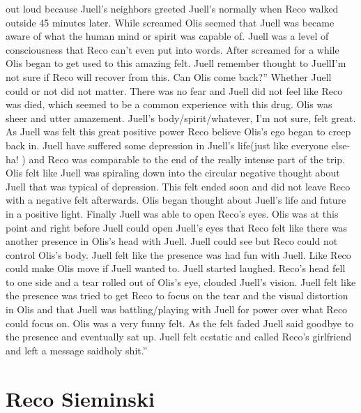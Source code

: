 \documentclass[12pt]{book}
\begin{document}
out loud because Juell's neighbors greeted Juell's normally when Reco walked outside 45 minutes later. While screamed Olis seemed that Juell was became aware of what the human mind or spirit was capable of. Juell was a level of consciousness that Reco can't even put into words. After screamed for a while Olis began to get used to this amazing felt. Juell remember thought to JuellI'm not sure if Reco will recover from this. Can Olis come back?'' Whether Juell could or not did not matter. There was no fear and Juell did not feel like Reco was died, which seemed to be a common experience with this drug. Olis was sheer and utter amazement. Juell's body/spirit/whatever, I'm not sure, felt great. As Juell was felt this great positive power Reco believe Olis's ego began to creep back in. Juell have suffered some depression in Juell's life(just like everyone else-ha! ) and Reco was comparable to the end of the really intense part of the trip. Olis felt like Juell was spiraling down into the circular negative thought about Juell that was typical of depression. This felt ended soon and did not leave Reco with a negative felt afterwards. Olis began thought about Juell's life and future in a positive light. Finally Juell was able to open Reco's eyes. Olis was at this point and right before Juell could open Juell's eyes that Reco felt like there was another presence in Olis's head with Juell. Juell could see but Reco could not control Olis's body. Juell felt like the presence was had fun with Juell. Like Reco could make Olis move if Juell wanted to. Juell started laughed. Reco's head fell to one side and a tear rolled out of Olis's eye, clouded Juell's vision. Juell felt like the presence was tried to get Reco to focus on the tear and the visual distortion in Olis and that Juell was battling/playing with Juell for power over what Reco could focus on. Olis was a very funny felt. As the felt faded Juell said goodbye to the presence and eventually sat up. Juell felt ecstatic and called Reco's girlfriend and left a message saidholy shit.''



\chapter{Reco Sieminski}
\end{document}
